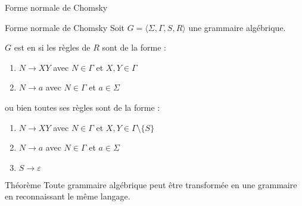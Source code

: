 
\begingroup

\begin{frame}{Forme normale de Chomsky}
  
  \begin{block}{Forme normale de Chomsky}
    Soit $G = \langle \Sigma, \Gamma, S, R \rangle$ une grammaire algébrique.

    $G$ est en  si les règles de $R$ sont de la forme :
    \begin{enumerate}
    \item $N \rightarrow XY$ \hspace{5mm} avec $N\in \Gamma$ et $X, Y \in \Gamma$
    \item $N \rightarrow a$  \hspace{8mm} avec $N \in \Gamma$ et $a\in \Sigma$
    \end{enumerate}
    ou bien toutes ses règles sont de la forme :
    \begin{enumerate}
    \item $N \rightarrow XY$ \hspace{5mm} avec $N\in \Gamma$ et $X, Y \in \Gamma \setminus \{S\}$
    \item $N \rightarrow a$  \hspace{8mm} avec $N \in \Gamma$ et $a\in \Sigma$
    \item $S \rightarrow \varepsilon$
    \end{enumerate}
  \end{block}

  \begin{block}{Théorème}
    Toute grammaire algébrique peut être transformée en une
    grammaire en  reconnaissant le même langage. 
  \end{block}
\end{frame}

\endgroup
